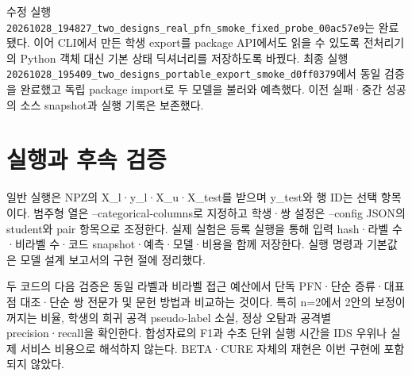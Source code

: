수정 실행 \texttt{20261028\allowbreak{}\_\allowbreak{}\allowbreak{}194827\_\allowbreak{}\allowbreak{}two\_\allowbreak{}\allowbreak{}desi\allowbreak{}gns\_\allowbreak{}\allowbreak{}real\allowbreak{}\_\allowbreak{}\allowbreak{}pfn\_\allowbreak{}\allowbreak{}smo\allowbreak{}ke\_\allowbreak{}\allowbreak{}fixed\allowbreak{}\_\allowbreak{}\allowbreak{}probe\_\allowbreak{}\allowbreak{}0\allowbreak{}0ac57e9}는 완료됐다. 이어 CLI에서 만든 학생 export를 package API에서도 읽을 수 있도록 전처리기의 Python 객체 대신 기본 상태 딕셔너리를 저장하도록 바꿨다. 최종 실행 \texttt{20261028\allowbreak{}\_\allowbreak{}\allowbreak{}195409\_\allowbreak{}\allowbreak{}two\_\allowbreak{}\allowbreak{}desi\allowbreak{}gns\_\allowbreak{}\allowbreak{}port\allowbreak{}able\_\allowbreak{}\allowbreak{}exp\allowbreak{}ort\_\allowbreak{}\allowbreak{}smok\allowbreak{}e\_\allowbreak{}\allowbreak{}d0ff03\allowbreak{}79}에서 동일 검증을 완료했고 독립 package import로 두 모델을 불러와 예측했다. 이전 실패·중간 성공의 소스 snapshot과 실행 기록은 보존했다.

\section{실행과 후속 검증}
일반 실행은 NPZ의 X\_\allowbreak{}l·y\_\allowbreak{}l·X\_\allowbreak{}u·X\_\allowbreak{}test를 받으며 y\_\allowbreak{}test와 행 ID는 선택 항목이다. 범주형 열은 --categorical-columns로 지정하고 학생·쌍 설정은 --config JSON의 student와 pair 항목으로 조정한다. 실제 실험은 등록 실행을 통해 입력 hash·라벨 수·비라벨 수·코드 snapshot·예측·모델·비용을 함께 저장한다. 실행 명령과 기본값은 모델 설계 보고서의 구현 절에 정리했다.

두 코드의 다음 검증은 동일 라벨과 비라벨 접근 예산에서 단독 PFN·단순 증류·대표점 대조·단순 쌍 전문가 및 문헌 방법과 비교하는 것이다. 특히 n=\allowbreak{}2에서 2안의 보정이 꺼지는 비율, 학생의 희귀 공격 pseudo-label 소실, 정상 오탐과 공격별 precision·recall을 확인한다. 합성자료의 F1과 수초 단위 실행 시간을 IDS 우위나 실제 서비스 비용으로 해석하지 않는다. BETA·CURE 자체의 재현은 이번 구현에 포함되지 않았다.

